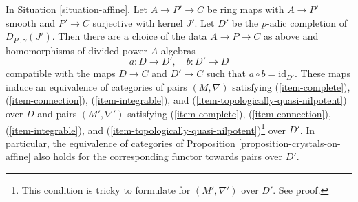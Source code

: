 \begin{lemma}
\label{lemma-crystals-on-affine-smooth}
In Situation \ref{situation-affine}.
Let $A \to P' \to C$ be ring maps with $A \to P'$ smooth and $P' \to C$
surjective with kernel $J'$. Let $D'$ be the $p$-adic completion of
$D_{P', \gamma}(J')$. Then there are a choice of the data $A \to P \to C$
as above and homomorphisms of divided power $A$-algebras
$$
a : D \longrightarrow D',\quad b : D' \longrightarrow D
$$
compatible with the maps $D \to C$ and $D' \to C$ such that
$a \circ b = \text{id}_{D'}$. These maps induce
an equivalence of categories of pairs $(M, \nabla)$ satisfying
(\ref{item-complete}), (\ref{item-connection}),
(\ref{item-integrable}), and (\ref{item-topologically-quasi-nilpotent})
over $D$ and pairs $(M', \nabla')$  satisfying
(\ref{item-complete}), (\ref{item-connection}),
(\ref{item-integrable}), and
(\ref{item-topologically-quasi-nilpotent})\footnote{This condition
is tricky to formulate for $(M', \nabla')$ over $D'$. See proof.} over $D'$.
In particular, the equivalence of categories of
Proposition \ref{proposition-crystals-on-affine}
also holds for the corresponding functor towards pairs over $D'$.
\end{lemma}

